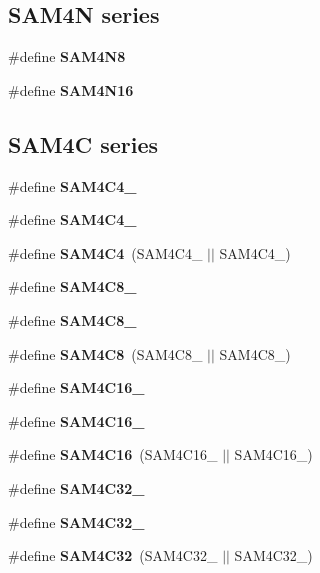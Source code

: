 \subsection*{S\+A\+M4\+N series}
\begin{DoxyCompactItemize}
\item 
\#define {\bfseries S\+A\+M4\+N8}
\item 
\#define {\bfseries S\+A\+M4\+N16}
\end{DoxyCompactItemize}
\subsection*{S\+A\+M4\+C series}
\begin{DoxyCompactItemize}
\item 
\#define {\bfseries S\+A\+M4\+C4\+\_}
\item 
\#define {\bfseries S\+A\+M4\+C4\+\_}
\item 
\hypertarget{group__sam__part__macros__group_ga63e801e944f8a131c2f940addf134ac7}{}\#define {\bfseries S\+A\+M4\+C4}~(S\+A\+M4\+C4\+\_ $\vert$$\vert$ S\+A\+M4\+C4\+\_)\label{group__sam__part__macros__group_ga63e801e944f8a131c2f940addf134ac7}

\item 
\#define {\bfseries S\+A\+M4\+C8\+\_}
\item 
\#define {\bfseries S\+A\+M4\+C8\+\_}
\item 
\hypertarget{group__sam__part__macros__group_ga8a05a38838ed43d62f89266155741aeb}{}\#define {\bfseries S\+A\+M4\+C8}~(S\+A\+M4\+C8\+\_ $\vert$$\vert$ S\+A\+M4\+C8\+\_)\label{group__sam__part__macros__group_ga8a05a38838ed43d62f89266155741aeb}

\item 
\#define {\bfseries S\+A\+M4\+C16\+\_}
\item 
\#define {\bfseries S\+A\+M4\+C16\+\_}
\item 
\hypertarget{group__sam__part__macros__group_ga74d1bd22ed59bc6a2c34d9d723332931}{}\#define {\bfseries S\+A\+M4\+C16}~(S\+A\+M4\+C16\+\_ $\vert$$\vert$ S\+A\+M4\+C16\+\_)\label{group__sam__part__macros__group_ga74d1bd22ed59bc6a2c34d9d723332931}

\item 
\#define {\bfseries S\+A\+M4\+C32\+\_}
\item 
\#define {\bfseries S\+A\+M4\+C32\+\_}
\item 
\hypertarget{group__sam__part__macros__group_ga4db5c63ded057f50bd4359538bc1299f}{}\#define {\bfseries S\+A\+M4\+C32}~(S\+A\+M4\+C32\+\_ $\vert$$\vert$ S\+A\+M4\+C32\+\_)\label{group__sam__part__macros__group_ga4db5c63ded057f50bd4359538bc1299f}

\end{DoxyCompactItemize}
